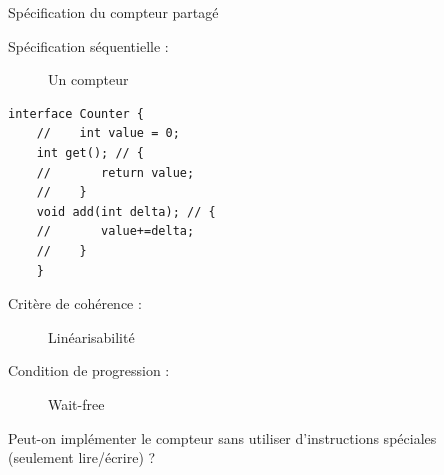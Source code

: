 
\begingroup

\begin{frame}[fragile]{Spécification du compteur partagé}

  \begin{description}
  \item[Spécification séquentielle :] Un compteur
  \end{description}

  \begin{lstlisting}[gobble=4]
    interface Counter {
    //    int value = 0; 
    int get(); // {
    //       return value;
    //    }
    void add(int delta); // {
    //       value+=delta;
    //    }
    }
  \end{lstlisting}

  \begin{description}
  \item[Critère de cohérence :] Linéarisabilité
  \item[Condition de progression :] Wait-free
  \end{description}

  \begin{center}
    \alert{Peut-on implémenter le compteur sans utiliser d'instructions spéciales \\
      (seulement lire/écrire) ?}
  \end{center}

  
\end{frame}

\endgroup
\endinput
